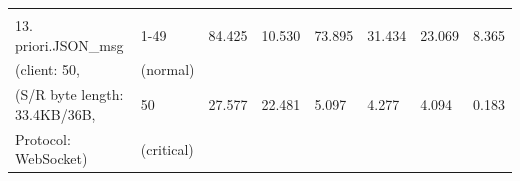 \begin{table}[htbp]
\begin{tabular}{m{} m{} m{} m{} m{} m{} m{} m{}}
        & & & & & & &\\
        13. priori.JSON\_msg          & 1-49       & 84.425  & 10.530 & 73.895  & 31.434  & 23.069 & 8.365   \\
        (client: 50,                  & (normal)   &         &        &         &         &        &         \\
        (S/R byte length: 33.4KB/36B, & 50         & 27.577  & 22.481 & 5.097   & 4.277   & 4.094  & 0.183   \\
        Protocol: WebSocket)          & (critical) &         &        &         &         &        &                             
    \end{tabular}%
    
    \end{table}




